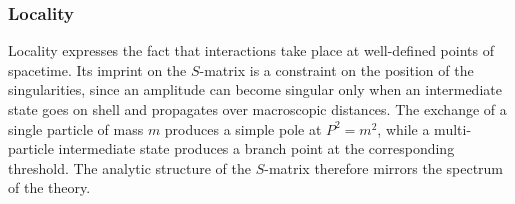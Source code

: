 \subsubsection{Locality}



Locality expresses the fact that interactions take place at well-defined points of spacetime. Its
imprint on the $S$-matrix is a constraint on the position of the singularities, since an amplitude
can become singular only when an intermediate state goes on shell and propagates over macroscopic
distances. The exchange of a single particle of mass $m$ produces a simple pole at $P^2=m^2$, while
a multi-particle intermediate state produces a branch point at the corresponding threshold. The
analytic structure of the $S$-matrix therefore mirrors the spectrum of the theory.

